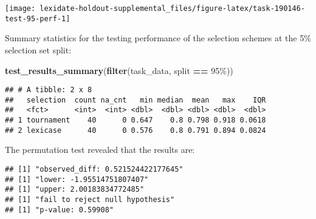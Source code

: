 \documentclass[
]{book}
\newenvironment{Shaded}{\begin{snugshade}}{\end{snugshade}}
\newcommand{\AttributeTok}[1]{\textcolor[rgb]{0.13,0.29,0.53}{#1}}
\newcommand{\DecValTok}[1]{\textcolor[rgb]{0.00,0.00,0.81}{#1}}
\newcommand{\FunctionTok}[1]{\textcolor[rgb]{0.13,0.29,0.53}{\textbf{#1}}}
\newcommand{\NormalTok}[1]{#1}
\newcommand{\OtherTok}[1]{\textcolor[rgb]{0.56,0.35,0.01}{#1}}
\newcommand{\SpecialCharTok}[1]{\textcolor[rgb]{0.81,0.36,0.00}{\textbf{#1}}}
\newcommand{\StringTok}[1]{\textcolor[rgb]{0.31,0.60,0.02}{#1}}
\begin{document}
\texttt{[image: lexidate-holdout-supplemental\_files/figure-latex/task-190146-test-95-perf-1]}

Summary statistics for the testing performance of the selection schemes at the 5\% selection set split:

\begin{Shaded}
\begin{Highlighting}[]
\FunctionTok{test\_results\_summary}\NormalTok{(}\FunctionTok{filter}\NormalTok{(task\_data, split }\SpecialCharTok{==} \StringTok{\textquotesingle{}95\%\textquotesingle{}}\NormalTok{))}
\end{Highlighting}
\end{Shaded}

\begin{verbatim}
## # A tibble: 2 x 8
##   selection  count na_cnt   min median  mean   max    IQR
##   <fct>      <int>  <int> <dbl>  <dbl> <dbl> <dbl>  <dbl>
## 1 tournament    40      0 0.647    0.8 0.798 0.918 0.0618
## 2 lexicase      40      0 0.576    0.8 0.791 0.894 0.0824
\end{verbatim}

The permutation test revealed that the results are:

\begin{Shaded}
\end{Shaded}

\begin{verbatim}
## [1] "observed_diff: 0.521524422177645"
## [1] "lower: -1.95514751807407"
## [1] "upper: 2.00183834772485"
## [1] "fail to reject null hypothesis"
## [1] "p-value: 0.59908"
\end{verbatim}
\end{document}
